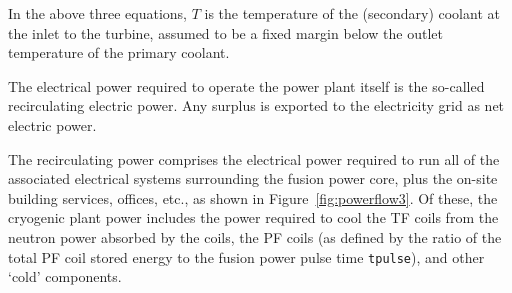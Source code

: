 \documentclass[11pt,a4paper]{report}
\begin{document}




In the above three equations, $T$ is the temperature of the (secondary)
coolant at the inlet to the turbine, assumed to be a fixed margin below the
outlet temperature of the primary coolant.

The electrical power required to operate the power plant itself is the
so-called recirculating electric power. Any surplus is exported to the
electricity grid as net electric power.

The recirculating power comprises the electrical power required to run all of
the associated electrical systems surrounding the fusion power core, plus the
on-site building services, offices, etc., as shown in
Figure~\ref{fig:powerflow3}. Of these, the cryogenic plant power includes the
power required to cool the TF coils from the neutron power absorbed by the
coils, the PF coils (as defined by the ratio of the total PF coil stored
energy to the fusion power pulse time \texttt{tpulse}), and other `cold'
components.
\end{document}
